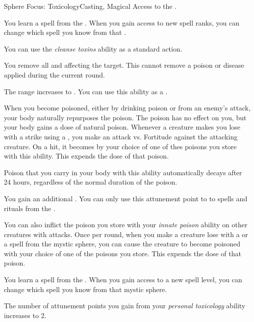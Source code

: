     \begin{feat}{Sphere Focus: Toxicology}{Casting, Magical}
        \featpre Access to the  .

         You learn a spell from the  .
        When you gain access to new spell ranks, you can change which spell you know from that .

         You can use the \textit{cleanse toxins} ability as a standard action.
        \begin{freeability}{}
            You remove all  and  affecting the target.
            This cannot remove a poison or disease applied during the current round.

            \rankline
             The range increases to \rngmed.
             You can use this ability as a .
        \end{freeability}

        When you become poisoned, either by drinking poison or from an enemy's attack, your body naturally repurposes the poison.
        The poison has no effect on you, but your body gains a dose of natural poison.
        Whenever a creature makes you lose  with a  strike using a , you make an attack vs. Fortitude against the attacking creature.
        On a hit, it becomes  by your choice of one of thes poisons you store with this ability.
        This expends the dose of that poison.

        Poison that you carry in your body with this ability automatically decays after 24 hours, regardless of the normal duration of the poison.

         You gain an additional .
        You can only use this attunement point to  to spells and rituals from the  .

        You can also inflict the poison you store with your \textit{innate poison} ability on other creatures with attacks.
        Once per round, when you make a creature lose  with a  or a spell from the  mystic sphere, you can cause the creature to become poisoned with your choice of one of the poisons you store.
        This expends the dose of that poison.

         You learn a spell from the  .
        When you gain access to a new spell level, you can change which spell you know from that mystic sphere.

         The number of attunement points you gain from your \textit{personal toxicology} ability increases to 2.
    \end{feat}

